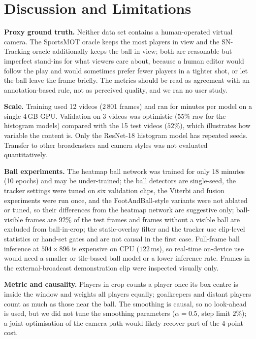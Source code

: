 \documentclass[conference]{IEEEtran}
\begin{document}
\section{Discussion and Limitations}
\textbf{Proxy ground truth.} Neither data set contains a human-operated virtual camera. The SportsMOT oracle keeps the most players in view and the SN-Tracking oracle additionally keeps the ball in view; both are reasonable but imperfect stand-ins for what viewers care about, because a human editor would follow the play and would sometimes prefer fewer players in a tighter shot, or let the ball leave the frame briefly. The metrics should be read as agreement with an annotation-based rule, not as perceived quality, and we ran no user study.

\textbf{Scale.} Training used 12 videos (2\,801 frames) and ran for minutes per model on a single 4\,GB GPU. Validation on 3 videos was optimistic ($55\%$ raw for the histogram models) compared with the 15 test videos ($52\%$), which illustrates how variable the content is. Only the ResNet-18 histogram model has repeated seeds. Transfer to other broadcasters and camera styles was not evaluated quantitatively.

\textbf{Ball experiments.} The heatmap ball network was trained for only 18 minutes (10 epochs) and may be under-trained; the ball detectors are single-seed, the tracker settings were tuned on six validation clips, the Viterbi and fusion experiments were run once, and the FootAndBall-style variants were not ablated or tuned, so their differences from the heatmap network are suggestive only; ball-visible frames are $92\%$ of the test frames and frames without a visible ball are excluded from ball-in-crop; the static-overlay filter and the tracker use clip-level statistics or hand-set gates and are not causal in the first case. Full-frame ball inference at $504{\times}896$ is expensive on CPU ($122$\,ms), so real-time on-device use would need a smaller or tile-based ball model or a lower inference rate. Frames in the external-broadcast demonstration clip were inspected visually only.

\textbf{Metric and causality.} Players in crop counts a player once its box centre is inside the window and weights all players equally; goalkeepers and distant players count as much as those near the ball. The smoothing is causal, so no look-ahead is used, but we did not tune the smoothing parameters ($\alpha=0.5$, step limit $2\%$); a joint optimisation of the camera path would likely recover part of the 4-point cost.
\end{document}

